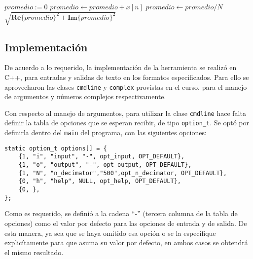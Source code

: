 	\begin{algorithmic}[H] %

	
			\State $promedio := 0$
				\State $promedio \gets promedio + x[n]$
			\EndFor
			\State $promedio \gets promedio / N$
			\Return $\sqrt{\mathbf{Re}\{promedio\}^2 + \mathbf{Im}\{promedio\}^2}$ 
		\EndWhile
	\end{algorithmic}

\newpage

\subsection{Implementación}
 De acuerdo a lo requerido, la implementación de la herramienta se realizó en C++, para entradas y salidas de texto en los formatos especificados. Para ello se aprovecharon las clases \texttt{cmdline} y \texttt{complex} provistas en el curso, para el manejo de argumentos y números complejos respectivamente.

 Con respecto al manejo de argumentos, para utilizar la clase \texttt{cmdline} hace falta definir la tabla de opciones que se esperan recibir, de tipo \texttt{option\_t}. Se optó por definirla dentro del \texttt{main} del programa, con las siguientes opciones:

%	

\lstset{language=C++}
\begin{lstlisting}[frame=single]
static option_t options[] = {
	{1, "i", "input", "-", opt_input, OPT_DEFAULT},
	{1, "o", "output", "-", opt_output, OPT_DEFAULT},
	{1, "N", "n_decimator","500",opt_n_decimator, OPT_DEFAULT},
	{0, "h", "help", NULL, opt_help, OPT_DEFAULT},
	{0, },
};
\end{lstlisting}

Como es requerido, se definió a la cadena ``-'' (tercera columna de la tabla de opciones) como el valor por defecto para las opciones de entrada y de salida. De esta manera, ya sea que se haya omitido esa opción o se la especifique explicítamente para que asuma su valor por defecto, en ambos casos se  obtendrá el mismo resultado.

